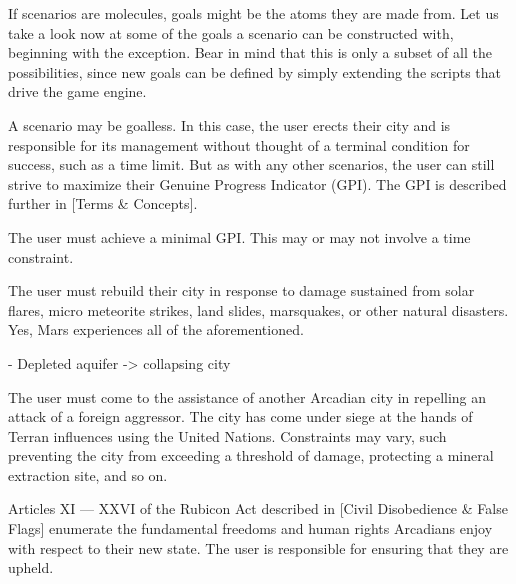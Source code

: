 

If scenarios are molecules, goals might be the atoms they are made from. Let us take a look now at some of the goals a scenario can be constructed with, beginning with the exception. Bear in mind that this is only a subset of all the possibilities, since new goals can be defined by simply extending the scripts that drive the game engine.

\startitemize[4]
\setupwhitespace[big]

A scenario may be goalless. In this case, the user erects their city and is responsible for its management without thought of a terminal condition for success, such as a time limit. But as with any other scenarios, the user can still strive to maximize their Genuine Progress Indicator (GPI). The GPI is described further in [Terms & Concepts].


The user must achieve a minimal GPI. This may or may not involve a time constraint.


The user must rebuild their city in response to damage sustained from solar flares, micro meteorite strikes, land slides, marsquakes, or other natural disasters. Yes, Mars experiences all of the aforementioned.

    - Depleted aquifer -> collapsing city


The user must come to the assistance of another Arcadian city in repelling an attack of a foreign aggressor. The city has come under siege at the hands of Terran influences using the United Nations. Constraints may vary, such preventing the city from exceeding a threshold of damage, protecting a mineral extraction site, and so on.


Articles XI --- XXVI of the Rubicon Act described in [Civil Disobedience & False Flags] enumerate the fundamental freedoms and human rights Arcadians enjoy with respect to their new state. The user is responsible for ensuring that they are upheld.


